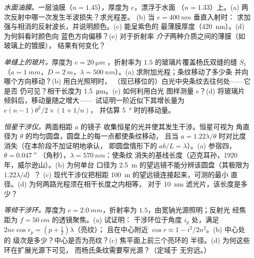 \begin{exercise}[$\star\star$]\label{exo:b2:two-wave-interference:9}
\emph{水面油膜。}一层油膜（$n = 1.45$），厚度为 $e$，漂浮于水面
（$n = 1.33$）上。(a) 两次反射中哪一次发生半波损失？求光程差。
(b) 当 $e = \qty{400}{nm}$ 垂直入射时：
求加强与相消的反射波长，并说明颜色。(c) 能呈紫色的
最薄膜厚度（\qty{420}{nm}）。(d) 为何斜看时颜色向
蓝色方向偏移？(e) 对于折射率
\emph{介于}两种介质之间的薄膜（如玻璃上的镀膜），
结果有何变化？
\end{exercise}

\begin{exercise}[$\star\star\star$]\label{exo:b2:two-wave-interference:10}
\emph{单缝上的玻片。}厚度为 $e = \qty{20}{\micro m}$
，折射率为 $1.5$ 的玻璃片覆盖杨氏双缝的缝 $S_1$（$a = \qty{1}{mm}$，$D =
\qty{2}{m}$，$\lambda = \qty{500}{nm}$）。(a) 求附加光程；条纹移动了多少条
并向哪个方向移动？(b) 用白光照明时，
（现已移位的）白光中央条纹去往何处——它是否
仍可见？相干长度为 \qty{1.5}{\micro m}。(c) 如何利用白光
图样测量 $e$？(d) 将玻璃片倾斜后，移动量随之增大——
试证明一阶近似下其增长量为 $e(n - 1)\theta^2/2 \times (1 + 1/n)$，
并估算 \qty{5}{\degree} 时的移动量。
\end{exercise}

\begin{exercise}[$\star\star\star$]\label{exo:b2:two-wave-interference:11}
\emph{恒星干涉仪。}两面相距 $a$ 的镜子
收集恒星的光并使其发生干涉。恒星可视为
角直径为 $\theta$ 的均匀圆盘，圆盘上的每一点都使条纹移动，
且当 $a = 1.22\lambda/\theta$ 时对比度消失（在本阶段不加证明地承认，
即圆盘情形下的 $ab/L = \lambda$）。(a) 参宿四，$\theta = \qty{0.047}{''}$
（角秒），$\lambda = \qty{570}{nm}$：使条纹
消失的基线长度（迈克耳孙，1920 年，威尔逊山）。(b) 为何单台
口径为 \qty{2.5}{m} 的望远镜不能分辨该圆盘（其极限为 $1.22\lambda/d$）？
(c) 现代干涉仪把相距 \qty{100}{m} 的望远镜连接起来，可测的最小
直径。(d) 为何两路光程须在相干长度之内相等，
对于 \qty{10}{nm} 滤光片，该长度是多少？
\end{exercise}

\begin{exercise}[$\star\star\star$]\label{exo:b2:two-wave-interference:12}
\emph{等倾干涉环。}厚度为 $e =
\qty{2.0}{mm}$，折射率为 $1.5$，由宽钠光源照明；反射光
经焦距为 $f = \qty{50}{cm}$ 的透镜聚焦。(a) 试证明：
干涉环位于角度 $i_p$ 处，满足 $2ne\cos r_p = (p + \tfrac12)\lambda$（亮纹）；
且在中心附近 $\cos r \approx 1 - i^2/2n^2$。(b) 中心处的
级次是多少？中心是否为亮纹？(c) 焦平面上前三个亮环的
半径。(d) 为何这些环在扩展光源下可见，
而杨氏条纹需要窄光源？（定域于
无穷远。）
\end{exercise}

